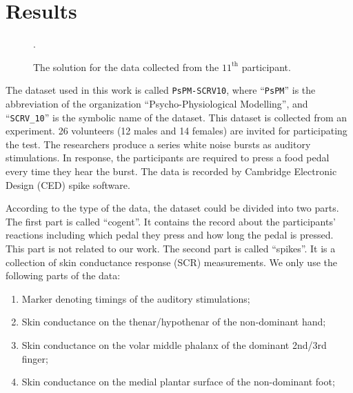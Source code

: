 \documentclass[10pt,conference]{ieeeconf}
\begin{document}
\section{Results}

\begin{figure*}[htbp]
  \centering
  \DeclareGraphicsExtensions.
  \caption{The solution for the data collected from the $11^{\mathrm{th}}$ participant.} \label{fig:results}
\end{figure*}

The dataset used in this work is called \texttt{PsPM-SCRV10}\cite{bach2014pspm}, where ``\texttt{PsPM}'' is the abbreviation of the organization ``Psycho-Physiological Modelling'', and ``\texttt{SCRV\_10}'' is the symbolic name of the dataset. This dataset is collected from an experiment. 26 volunteers (12 males and 14 females) are invited for participating the test. The researchers produce a series white noise bursts as auditory stimulations. In response, the participants are required to press a food pedal every time they hear the burst. The data is recorded by Cambridge Electronic Design (CED) spike software.

According to the type of the data, the dataset could be divided into two parts. The first part is called ``cogent''. It contains the record about the participants' reactions including which pedal they press and how long the pedal is pressed. This part is not related to our work. The second part is called ``spikes''. It is a collection of skin conductance response (SCR) measurements. We only use the following parts of the data:

\begin{enumerate}
  \item Marker denoting timings of the auditory stimulations;
  \item Skin conductance on the thenar/hypothenar of the non-dominant hand;
  \item Skin conductance on the volar middle phalanx of the dominant 2nd/3rd finger;
  \item Skin conductance on the medial plantar surface of the non-dominant foot;
\end{enumerate}
\end{document}
